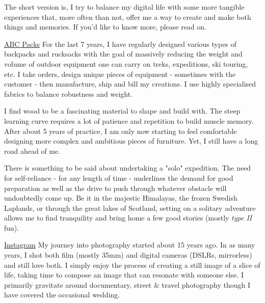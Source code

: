 \documentclass[10pt,a4paper]{moderncv}
\begin{document}
  The short version is, I try to balance my digital life with some more tangible experiences that, more often than not, offer me a way to create and make both things and memories. If you'd like to know more, please read on.

  \vspace{1.5em}

  {\href{https://abcpacks.com}{ABC Packs}}
  {
    For the last 7 years, I have regularly designed various types of backpacks and rucksacks with the goal of massively reducing the weight and volume of outdoor equipment one can carry on treks, expeditions, ski touring, etc. I take orders, design unique pieces of equipment - sometimes with the customer - then manufacture, ship and bill my creations. I use highly specialised fabrics to balance robustness and weight.
  }
  
  {}
  {
    I find wood to be a fascinating material to shape and build with. The steep learning curve requires a lot of patience and repetition to build muscle memory. After about 5 years of practice, I am only now starting to feel comfortable designing more complex and ambitious pieces of furniture. Yet, I still have a long road ahead of me.
  }

  {}
  {
    There is something to be said about undertaking a "solo" expedition. The need for self-reliance - for any length of time - underlines the demand for good preparation as well as the drive to push through whatever obstacle will undoubtedly come up. Be it in the majestic Himalayas, the frozen Swedish Laplands, or through the great lakes of Scotland, setting on a solitary adventure allows me to find tranquility and bring home a few good stories (mostly \emph{type II} fun).
  }

  {\href{https://www.instagram.com/250th_of_a_second/}{Instagram}}
  {
    My journey into photography started about 15 years ago. In as many years, I shot both film (mostly 35mm) and digital cameras (DSLRs, mirrorless) and still love both. I simply enjoy the process of creating a still image of a slice of life, taking time to compose an image that can resonate with someone else. I primarily gravitate around documentary, street \& travel photography though I have covered the occasional wedding.
  }
\end{document}
